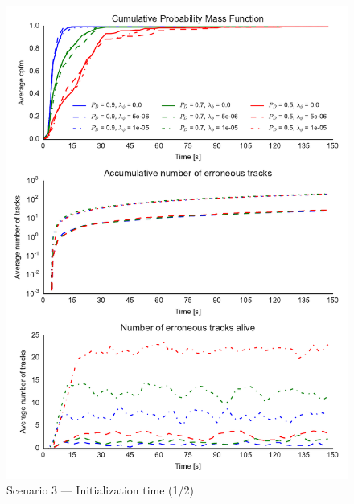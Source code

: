 

\begin{figure}
\centering
\includegraphics{Figures/plots/Scenario3_Init-Time(1-2).pdf}
\caption{Scenario 3 --- Initialization time (1/2)}\label{fig:init3_time_1-2}
\end{figure}

